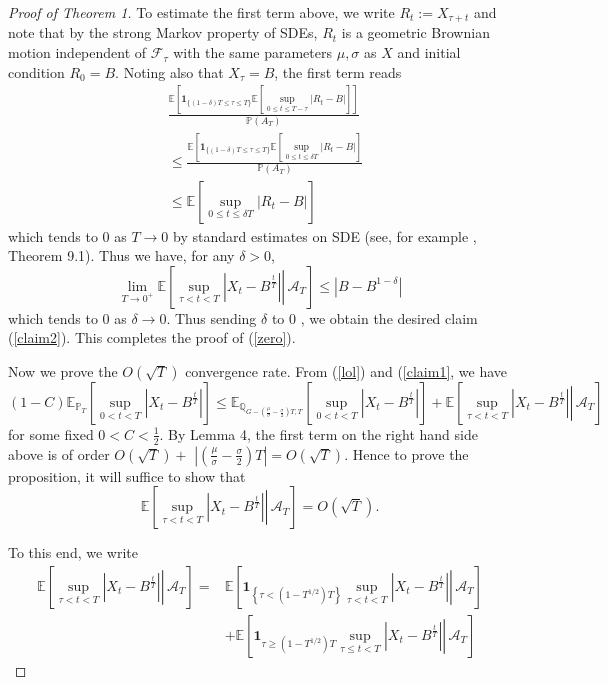 \documentclass{article}
\theoremstyle{definition}
\theoremstyle{definition}
\begin{document}
\begin{proof}[Proof of Theorem 1]
To estimate the first term above, we write $R_{t}:=X_{\tau+t}$ and note that by the strong Markov property of SDEs, $R_{t}$ is a geometric Brownian motion independent of $\mathcal{F}_{\tau}$ with the same parameters $\mu, \sigma$ as $X$ and initial condition $R_{0}=B$. Noting also that $X_{\tau}=B$, the first term reads
$$
\begin{aligned}
& \frac{\mathbb{E}\left[\mathbf{1}_{\{(1-\delta) T \leq \tau \leq T\}} \mathbb{E}\left[\sup _{0 \leq t \leq T-\tau}\left|R_{t}-B\right|\right]\right]}{\mathbb{P}\left(A_{T}\right)} \\
& \leq \frac{\mathbb{E}\left[\mathbf{1}_{\{(1-\delta) T \leq \tau \leq T\}} \mathbb{E}\left[\sup _{0 \leq t \leq \delta T}\left|R_{t}-B\right|\right]\right.}{\mathbb{P}\left(A_{T}\right)} \\
& \leq \mathbb{E}\left[\sup _{0 \leq t \leq \delta T}\left|R_{t}-B\right|\right]
\end{aligned}
$$
which tends to 0 as $T \rightarrow 0$ by standard estimates on SDE (see, for example \cite{baldi}, Theorem 9.1). Thus we have, for any $\delta>0$,
$$
\lim _{T \rightarrow 0^{+}} \mathbb{E}\left[\left.\sup _{\tau<t<T}\left|X_{t}-B^{\frac{t}{T}}\right| \right\rvert\, \mathcal{A}_{T}\right] \leq\left|B-B^{1-\delta}\right|
$$
which tends to 0 as $\delta \rightarrow 0$. Thus sending $\delta$ to 0 , we obtain the desired claim (\ref{claim2}). This completes the proof of (\ref{zero}).

Now we prove the $O(\sqrt{T})$ convergence rate. From (\ref{lol}) and (\ref{claim1}, we have
$$
(1-C) \mathbb{E}_{\mathbb{P}_{T}}\left[\sup _{0<t<T}\left|X_{t}-B^{\frac{t}{T}}\right|\right] \leq \mathbb{E}_{\mathbb{Q}_{G-\left(\frac{\mu}{\sigma}-\frac{\sigma}{2}\right)T, T}}\left[\sup _{0<t<T}\left|X_{t}-B^{\frac{t}{T}}\right|\right]+\mathbb{E}\left[\left.\sup _{\tau<t<T}\left|X_{t}-B^{\frac{t}{T}}\right| \right\rvert\, \mathcal{A}_{T}\right]
$$
for some fixed $0<C<\frac{1}{2}$. By Lemma 4, the first term on the right hand side above is of order $O(\sqrt{T})+$ $\left|\left(\frac{\mu}{\sigma}-\frac{\sigma}{2}\right) T\right|=O(\sqrt{T})$. Hence to prove the proposition, it will suffice to show that
$$
\mathbb{E}\left[\left.\sup _{\tau<t<T}\left|X_{t}-B^{\frac{t}{T}}\right| \right\rvert\, \mathcal{A}_{T}\right]=O(\sqrt{T}) .
$$

To this end, we write
$$
\begin{aligned}
\mathbb{E}\left[\left.\sup _{\tau<t<T}\left|X_{t}-B^{\frac{t}{T}}\right| \right\rvert\, \mathcal{A}_{T}\right]= & \mathbb{E}\left[\left.\mathbf{1}_{\left\{\tau<\left(1-T^{1 / 2}\right) T\right\}} \sup _{\tau<t<T}\left|X_{t}-B^{\frac{t}{T}}\right| \right\rvert\, \mathcal{A}_{T}\right] \\
& +\mathbb{E}\left[\left.\mathbf{1}_{\tau \geq\left(1-T^{1 / 2}\right) T} \sup _{\tau \leq t<T}\left|X_{t}-B^{\frac{t}{T}}\right| \right\rvert\, \mathcal{A}_{T}\right]
\end{aligned}
$$


\end{proof}
\end{document}

